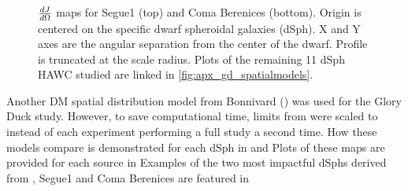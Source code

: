 \begin{figure}
    \caption{$\frac{dJ}{d\Omega}$ maps for Segue1 (top) and Coma Berenices (bottom). Origin is centered on the specific dwarf spheroidal galaxies (dSph). X and Y axes are the angular separation from the center of the dwarf. Profile is truncated at the scale radius. Plots of the remaining 11 dSph HAWC studied are linked in \cref{fig:apx_gd_spatialmodels}.}\label{fig:gd_spatialmodel}
\end{figure}

Another DM spatial distribution model from Bonnivard (\B) \cite{Bonnivard:2014kza} was used for the Glory Duck study.
However, to save computational time, limits from \GS were scaled to \B instead of each experiment performing a full study a second time.
How these models compare is demonstrated for each dSph in  and 
Plots of these maps are provided for each source in 
Examples of the two most impactful dSphs derived from \GS, Segue1 and Coma Berenices are featured in 

